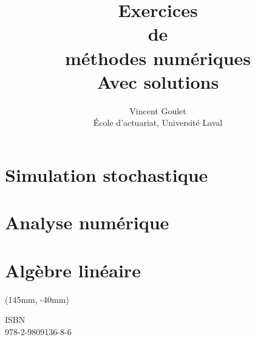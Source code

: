 \documentclass[letterpaper,10pt]{memoir}
\title{\HUGE
    \fontseries{ub}\selectfont Exercices \\
    \fontseries{m}\selectfont  de \\
    \fontseries{ub}\selectfont méthodes numériques \\[0.5\baselineskip]
    \huge\fontseries{m}\selectfont Avec solutions}
\author{\LARGE Vincent Goulet \\[3mm]
    \large École d'actuariat, Université Laval}
\date{}
\newcommand{\ISBN}{978-2-9809136-8-6}
\begin{document}

\frontmatter

\pagestyle{empty}


\pagestyle{companion}



\cleardoublepage
\tableofcontents*

\mainmatter


\part{Simulation stochastique}
\label{part:simulation}




\part{Analyse numérique}
\label{part:analysenumerique}




\part{Algèbre linéaire}
\label{part:algebrelineaire}





\appendix


\nocite{Monahan_01,Rubinstein_81}


\cleardoublepage
\cleartoverso

\pagestyle{empty}
\renewcommand{\ttdefault}{hlst}

\bandeverso
\begin{textblock*}{71mm}(145mm, -40mm)
  \large\ttfamily\raggedright
  \textblockcolor{}
  ISBN \\ \ISBN
\end{textblock*}
\end{document}
